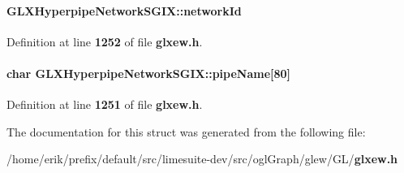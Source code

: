 \paragraph[{network\+Id}]{ G\+L\+X\+Hyperpipe\+Network\+S\+G\+I\+X\+::network\+Id}\label{structGLXHyperpipeNetworkSGIX_a81393053988b32fadb0b21615024add1}


Definition at line {\bf 1252} of file {\bf glxew.\+h}.

\paragraph[{pipe\+Name}]{\setlength{\rightskip}{0pt plus 5cm}char G\+L\+X\+Hyperpipe\+Network\+S\+G\+I\+X\+::pipe\+Name[80]}\label{structGLXHyperpipeNetworkSGIX_a91dc68bdd22c2a458ecb58037cd085bd}


Definition at line {\bf 1251} of file {\bf glxew.\+h}.



The documentation for this struct was generated from the following file\+:\begin{DoxyCompactItemize}
\item 
/home/erik/prefix/default/src/limesuite-\/dev/src/ogl\+Graph/glew/\+G\+L/{\bf glxew.\+h}\end{DoxyCompactItemize}
